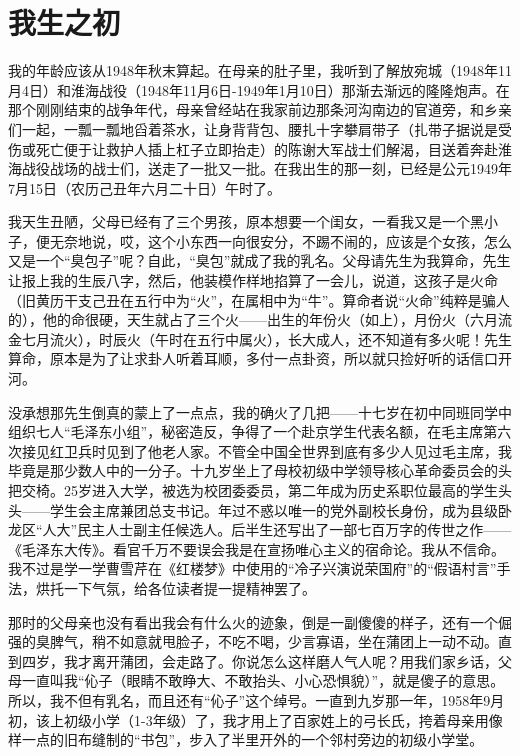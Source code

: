 \documentclass[../../dazhuan.tex]{subfiles}
\begin{document}
    \chapter*{我生之初}

我的年龄应该从1948年秋末算起。在母亲的肚子里，我听到了解放宛城（1948年11月4日）和淮海战役（1948年11月6日-1949年1月10日）那渐去渐远的隆隆炮声。在那个刚刚结束的战争年代，母亲曾经站在我家前边那条河沟南边的官道旁，和乡亲们一起，一瓢一瓢地舀着茶水，让身背背包、腰扎十字攀肩带子（扎带子据说是受伤或死亡便于让救护人插上杠子立即抬走）的陈谢大军战士们解渴，目送着奔赴淮海战役战场的战士们，送走了一批又一批。在我出生的那一刻，已经是公元1949年7月15日（农历己丑年六月二十日）午时了。

我天生丑陋，父母已经有了三个男孩，原本想要一个闺女，一看我又是一个黑小子，便无奈地说，哎，这个小东西一向很安分，不踢不闹的，应该是个女孩，怎么又是一个“臭包子”呢？自此，“臭包”就成了我的乳名。父母请先生为我算命，先生让报上我的生辰八字，然后，他装模作样地掐算了一会儿，说道，这孩子是火命（旧黄历干支己丑在五行中为“火”，在属相中为“牛”。算命者说“火命”纯粹是骗人的），他的命很硬，天生就占了三个火——出生的年份火（如上），月份火（六月流金七月流火），时辰火（午时在五行中属火），长大成人，还不知道有多火呢！先生算命，原本是为了让求卦人听着耳顺，多付一点卦资，所以就只捡好听的话信口开河。

没承想那先生倒真的蒙上了一点点，我的确火了几把——十七岁在初中同班同学中组织七人“毛泽东小组”，秘密造反，争得了一个赴京学生代表名额，在毛主席第六次接见红卫兵时见到了他老人家。不管全中国全世界到底有多少人见过毛主席，我毕竟是那少数人中的一分子。十九岁坐上了母校初级中学领导核心革命委员会的头把交椅。25岁进入大学，被选为校团委委员，第二年成为历史系职位最高的学生头头——学生会主席兼团总支书记。年过不惑以唯一的党外副校长身份，成为县级卧龙区“人大”民主人士副主任候选人。后半生还写出了一部七百万字的传世之作——《毛泽东大传》。看官千万不要误会我是在宣扬唯心主义的宿命论。我从不信命。我不过是学一学曹雪芹在《红楼梦》中使用的“冷子兴演说荣国府”的“假语村言”手法，烘托一下气氛，给各位读者提一提精神罢了。

那时的父母亲也没有看出我会有什么火的迹象，倒是一副傻傻的样子，还有一个倔强的臭脾气，稍不如意就甩脸子，不吃不喝，少言寡语，坐在蒲团上一动不动。直到四岁，我才离开蒲团，会走路了。你说怎么这样磨人气人呢？用我们家乡话，父母一直叫我“伈子（眼睛不敢睁大、不敢抬头、小心恐惧貌）”，就是傻子的意思。所以，我不但有乳名，而且还有“伈子”这个绰号。一直到九岁那一年，1958年9月初，该上初级小学（1-3年级）了，我才用上了百家姓上的弓长氏，挎着母亲用像样一点的旧布缝制的“书包”，步入了半里开外的一个邻村旁边的初级小学堂。
\end{document}
